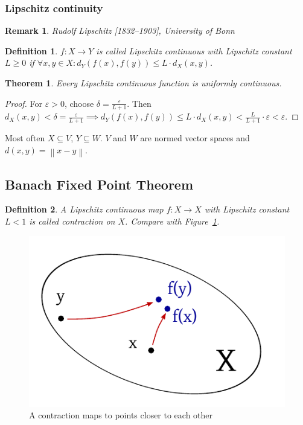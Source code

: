 \documentclass{article}
\newtheorem{theorem}{Theorem}  \numberwithin{theorem}{section}
\newtheorem{definition}{Definition}  \numberwithin{definition}{section}
\newtheorem{remark}{Remark}  \numberwithin{remark}{section}
\newcommand{\norm}[1]{\left\|#1\right\|}
\begin{document}
\subsubsection{Lipschitz continuity}
\begin{remark}
  Rudolf Lipschitz [1832--1903], University of Bonn
\end{remark}
\begin{definition} %
  $f: X \to Y$ is called \emph{Lipschitz continuous} with \emph{Lipschitz constant} $L \geq 0$ if $\forall x, y \in X: d_Y(f(x), f(y)) \leq L \cdot d_X(x,y)$.
\end{definition}

\begin{theorem}
  Every Lipschitz continuous function is uniformly continuous.
\end{theorem}
\begin{proof}
  For $\varepsilon > 0$, choose $\delta = \frac{\varepsilon}{L+1}$. Then
  $d_X(x,y) < \delta = \frac{\varepsilon}{L+1} \implies d_Y(f(x), f(y)) \leq L \cdot d_X(x,y) < \frac{L}{L+1} \cdot \varepsilon < \varepsilon$.
\end{proof}

Most often $X \subseteq V$, $Y \subseteq W$. $V$ and $W$ are normed vector spaces and $d(x, y) = \norm{x - y}$.

\subsection{Banach Fixed Point Theorem}
\begin{definition} %
  A Lipschitz continuous map $f: X \to X$ with Lipschitz constant $L < 1$ is called \emph{contraction on $X$}. Compare with Figure~\ref{img:contraction}.
\end{definition}

\begin{figure}[t]
  \begin{center}
    \includegraphics{img/07_contraction.pdf}
    \caption{A contraction maps to points closer to each other}
    \label{img:contraction}
  \end{center}
\end{figure}
\end{document}
